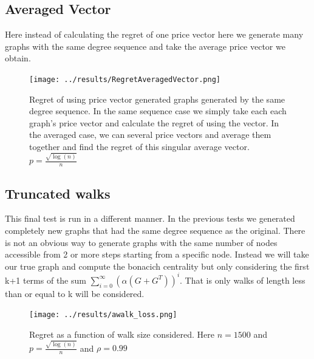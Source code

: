 \documentclass[12pt]{article}
\begin{document}
\subsection{Averaged Vector}
  Here instead of calculating the regret of one price vector here we generate many graphs with the same degree sequence and take the average price vector we obtain.
\begin{figure}[H]
  \centering
  \texttt{[image: ../results/RegretAveragedVector.png]}
  \caption{Regret of using price vector generated graphs generated by the same degree sequence. In the same sequence case we simply take each each graph's price vector and calculate the regret of using the vector. In the averaged case, we can several price vectors and average them together and find the regret of this singular average vector. $p=\frac{\sqrt{\log(n)}}{n}$}
\end{figure}

\subsection{Truncated walks}
This final test is run in a different manner. In the previous tests we generated completely new graphs that had the same degree sequence as the original. There is not an obvious way to generate graphs with the same number of nodes accessible from 2 or more steps starting from a specific  node. Instead we will take our true graph and compute the bonacich centrality but only considering the first k+1 terms of the sum $\sum_{i=0}^{\infty} (\alpha (G+G^{T}))^{i}$. That is only walks of length less than or equal to k  will be considered.


\begin{figure}[H]
  \centering
  \texttt{[image: ../results/awalk\_loss.png]}
  \caption{Regret as a function of walk size considered. Here $n=1500$ and $p=\frac{\sqrt{\log(n)}}{n}$ and $\rho=0.99$}
\end{figure}
\end{document}
